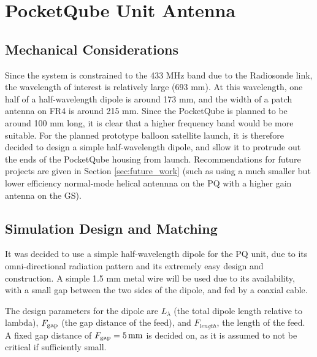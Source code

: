 \graphicspath{{./figures}}

\section{PocketQube Unit Antenna}
\subsection{Mechanical Considerations}
Since the system is constrained to the 433 MHz band due to the Radiosonde link, the wavelength of interest is relatively large (693 mm). At this wavelength, one half of a half-wavelength dipole is around 173 mm, and the width of a patch antenna on FR4 is around 215 mm. Since the PocketQube is planned to be around 100 mm long, it is clear that a higher frequency band would be more suitable. For the planned prototype balloon satellite launch, it is therefore decided to design a simple half-wavelength dipole, and sllow it to protrude out the ends of the PocketQube housing from launch. Recommendations for future projects are given in Section \ref{sec:future_work} (such as using a much smaller but lower efficiency normal-mode helical antennna on the PQ with a higher gain antenna on the GS).

\subsection{Simulation Design and Matching}
It was decided to use a simple half-wavelength dipole for the PQ unit, due to its omni-directional radiation pattern and its extremely easy design and construction. A simple 1.5 mm metal wire will be used due to its availability, with a small gap between the two sides of the dipole, and fed by a coaxial cable.

The design parameters for the dipole are $L_\lambda$ (the total dipole length relative to lambda), $F_{\textnormal{gap}}$ (the gap distance of the feed), and $F_{length}$, the length of the feed. A fixed gap distance of $F_{\textnormal{gap}} = \SI{5}{mm}$ is decided on, as it is assumed to not be critical if sufficiently small.

